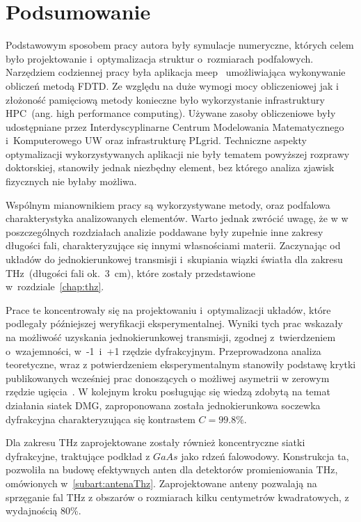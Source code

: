 \chapter{Podsumowanie}
Podstawowym sposobem pracy autora były symulacje numeryczne, których celem było projektowanie i~optymalizacja struktur o~rozmiarach podfalowych. Narzędziem codziennej pracy była aplikacja meep~\cite{OskooiRo10} umożliwiająca wykonywanie obliczeń metodą FDTD. Ze względu na duże wymogi mocy obliczeniowej jak i złożoność pamięciową metody konieczne było wykorzystanie infrastruktury HPC~(ang. high performance computing). Używane zasoby obliczeniowe były udostępniane przez Interdyscyplinarne Centrum Modelowania Matematycznego i~Komputerowego UW oraz infrastrukturę PLgrid. Techniczne aspekty optymalizacji wykorzystywanych aplikacji nie były tematem powyższej rozprawy doktorskiej, stanowiły jednak niezbędny element, bez którego analiza zjawisk fizycznych nie byłaby możliwa.

Wspólnym mianownikiem pracy są wykorzystywane metody, oraz podfalowa charakterystyka analizowanych elementów. Warto jednak zwrócić uwagę, że w w poszczególnych rozdziałach analizie poddawane były zupełnie inne zakresy długości fali, charakteryzujące się innymi własnościami materii. Zaczynając od układów do jednokierunkowej transmisji i~skupiania wiązki światła dla zakresu THz~(długości fali ok.~3~cm), które zostały przedstawione w~rozdziale~\ref{chap:thz}. 

Prace te koncentrowały się na projektowaniu i~optymalizacji układów, które podlegały późniejszej weryfikacji eksperymentalnej. Wyniki tych prac wskazały na możliwość uzyskania jednokierunkowej transmisji, zgodnej z~twierdzeniem o~wzajemności, w~-1~i~+1 rzędzie dyfrakcyjnym. Przeprowadzona analiza teoretyczne, wraz z potwierdzeniem eksperymentalnym stanowiły podstawę krytki publikowanych wcześniej prac donoszących o możliwej asymetrii w zerowym rzędzie ugięcia~\cite{Stolarek:13}. W kolejnym kroku posługując się wiedzą zdobytą na temat działania siatek DMG, zaproponowana została jednokierunkowa soczewka dyfrakcyjna charakteryzująca się kontrastem $C=99.8\%$. 

Dla zakresu THz zaprojektowane zostały również koncentryczne siatki dyfrakcyjne, traktujące podkład z $GaAs$ jako rdzeń falowodowy. Konstrukcja ta, pozwoliła na budowę efektywnych anten dla detektorów promieniowania THz, omówionych w~\ref{subart:antenaThz}. Zaprojektowane anteny pozwalają na sprzęganie fal THz z obszarów o rozmiarach kilku centymetrów kwadratowych, z wydajnością  80\%.

